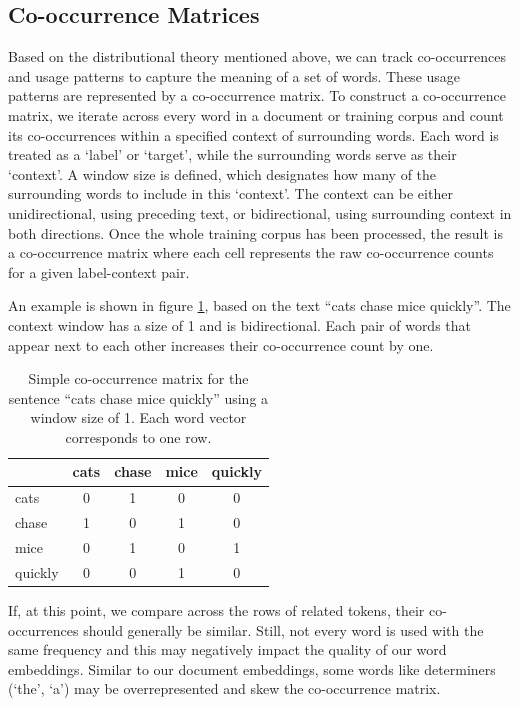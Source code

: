 \subsection{Co-occurrence Matrices}

Based on the distributional theory mentioned above, we can track co-occurrences and usage patterns to capture the meaning of a set of words. These usage patterns are represented by a co-occurrence matrix. To construct a co-occurrence matrix, we iterate across every word in a document or training corpus and count its co-occurrences within a specified context of surrounding words. Each word is treated as a `label' or `target', while the surrounding words serve as their `context'. A window size is defined, which designates how many of the surrounding words to include in this `context'. The context can be either unidirectional, using  preceding text, or bidirectional, using surrounding context in both directions. Once the whole training corpus has been processed, the result is a co-occurrence matrix where each cell represents the raw co-occurrence counts for a given label-context pair.

An example is shown in figure \ref{simpleCoocmatrix}, based on the text ``cats chase mice quickly''.  The context window has a size of 1 and is bidirectional. Each pair of words that appear next to each other increases their co-occurrence count by one.

\begin{table}[h]
    \centering
    \begin{tabular}{|l|c|c|c|c|}
    \hline
     & cats & chase & mice & quickly \\
    \hline
    cats & 0 & 1 & 0 & 0 \\
    \hline
    chase & 1 & 0 & 1 & 0 \\
    \hline
    mice & 0 & 1 & 0 & 1 \\
    \hline
    quickly & 0 & 0 & 1 & 0 \\
    \hline
    \end{tabular}
    \caption{Simple co-occurrence matrix for the sentence ``cats chase mice quickly'' using a window size of 1. Each word vector corresponds to one row.}
    \label{simpleCoocmatrix}
\end{table}


If, at this point, we compare across the rows of related tokens, their co-occurrences should generally be similar. Still, not every word is used with the same frequency and this may negatively impact the quality of our word embeddings. Similar to our document embeddings, some words like determiners (`the', `a') may be overrepresented and skew the co-occurrence matrix.

